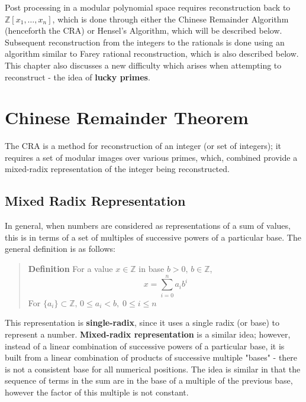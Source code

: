 \documentclass[letterpaper,12pt,titlepage,oneside,final]{book}
\newenvironment{defn}{\begin{quote}%
  \textbf{Definition }%
  \quad
}{%
\end{quote}%
}
\begin{document}
Post processing in a modular polynomial space requires reconstruction back to ${\mathbb{Z}[x_1, \ldots, x_n]}$, which is done through either the Chinese Remainder Algorithm (henceforth the CRA) or Hensel's Algorithm, which will be described below.  Subsequent reconstruction from the integers to the rationals is done using an algorithm similar to Farey rational reconstruction, which is also described below.  This chapter also discusses a new difficulty which arises when attempting to reconstruct - the idea of \textbf{lucky primes}. 

\section{Chinese Remainder Theorem} 

The CRA is a method for reconstruction of an integer (or set of integers); it requires a set of modular images over various primes, which, combined provide a mixed-radix representation of the integer being reconstructed.  

\subsection{Mixed Radix Representation}

In general, when numbers are considered as representations of a sum of values, this is in terms of a set of multiples of successive powers of a particular base.  The general definition is as follows:

\begin{defn}\label{Basic defn}
  For a value ${x \in \mathbb{Z}}$ in base ${b > 0,\, b \in \mathbb{Z}}$,
  \begin{equation*}   x = \sum\limits_{i = 0}^{n}{a_ib^i}     \end{equation*}
  For ${\{a_i\} \subset \mathbb{Z},\, 0 \leq a_i < b, \; 0 \leq i \leq n}$ 
\end{defn}

This representation is \textbf{single-radix}, since it uses a single radix (or base) to represent a number.  \textbf{Mixed-radix representation} is a similar idea; however, instead of a linear combination of successive powers of a particular base, it is built from a linear combination of products of successive multiple "bases" - there is not a consistent base for all numerical positions.  The idea is similar in that the sequence of terms in the sum are in the base of a multiple of the previous base, however the factor of this multiple is not constant.  
\end{document}
